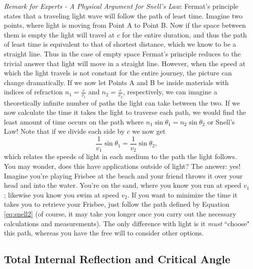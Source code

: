 \emph{Remark for Experts - A Physical Argument for Snell's Law}: Fermat's principle states that a traveling light wave will follow the path of least time.  Imagine two points, where light is moving from Point A to Point B.  Now if the space between them is empty the light will travel at $c$ for the entire duration, and thus the path of least time is equivalent to that of shortest distance, which we know to be a straight line.  Thus in the case of empty space Fermat's principle reduces to the trivial answer that light will move in a straight line.  However, when the speed at which the light travels is not constant for the entire journey, the picture can change dramatically.  If we now let Points A and B be inside materials with indices of refraction $n_{1} = \frac{c}{v_{1}}$ and $n_{2} = \frac{c}{v_{2}}$, respectively, we can imagine a theoretically infinite number of paths the light can take between the two.  If we now calculate the time it takes the light to traverse each path, we would find the least amount of time occurs on the path where $n_{1}\sin \theta _{1} = n_{2}\sin \theta _{2}$ or Snell's Law!  Note that if we divide each side by $c$ we now get
\begin{equation}
	\label{eq:snell2}
	\frac{1}{v_{1}}\sin \theta _{1} = \frac{1}{v_{2}}\sin \theta _{2},
\end{equation}
which relates the speeds of light in each medium to the path the light follows.  You may wonder, does this have applications outside of light?  The answer: yes!  Imagine you're playing Frisbee at the beach and your friend throws it over your head and into the water.  You're on the sand, where you know you run at speed $v_{1}$; likewise you know you swim at speed $v_{2}$.  If you want to minimize the time it takes you to retrieve your Frisbee, just follow the path defined by Equation \eqref{eq:snell2} (of course, it may take you longer once you carry out the necessary calculations and measurements).  The only difference with light is it \textit{must} ``choose" this path, whereas you have the free will to consider other options.

\subsection{Total Internal Reflection and Critical Angle}

